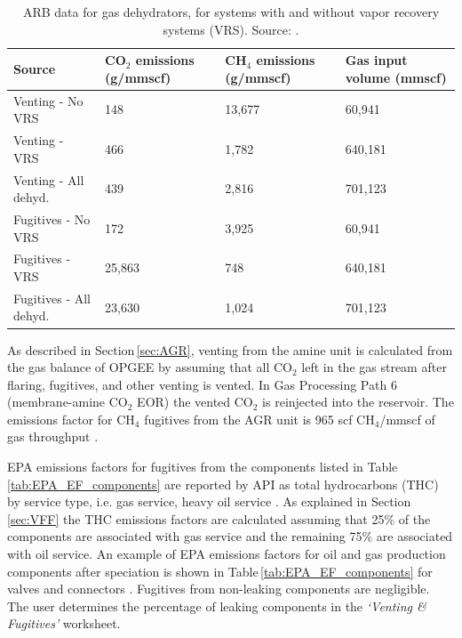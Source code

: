 \documentclass[11pt]{report}
\newcommand{\sheet}[1]{\textit{`{#1}'}}
\begin{document}
\begin{table}
\begin{scriptsize}
\caption{ARB data for gas dehydrators, for systems with and without vapor recovery systems (VRS). Source: \cite{ARB2013}.}
\label{tab:ARB_dehydrators_EF}
\begin{threeparttable}
\begin{tabular*}{0.9\columnwidth}{p{}p{}p{}p{}}
\toprule
Source & CO$_{2}$ emissions (g/mmscf) & CH$_{4}$ emissions (g/mmscf) & Gas input volume (mmscf) \\
\midrule
Venting - No VRS & 148 & 13,677 & 60,941 \\ 
Venting - VRS & 466 & 1,782 & 640,181 \\
Venting - All dehyd. & 439 & 2,816 & 701,123 \\
\midrule
Fugitives - No VRS & 172 & 3,925 & 60,941 \\
Fugitives - VRS & 25,863 & 748 & 640,181 \\ 
Fugitives - All dehyd. & 23,630 & 1,024 & 701,123 \\
\bottomrule
\end{tabular*}
\end{threeparttable}
\end{scriptsize}
\end{table}



As described in Section\,\ref{sec:AGR}, venting from the amine unit is calculated from the gas balance of OPGEE by assuming that all CO$_{2}$ left in the gas stream after flaring, fugitives, and other venting is vented. In Gas Processing Path 6 (membrane-amine CO$_2$ EOR) the vented CO$_2$ is reinjected into the reservoir. The emissions factor for CH$_{4}$ fugitives from the AGR unit is 965 scf CH$_{4}$/mmscf of gas throughput \cite[p. 23]{EPA1996}. 

EPA emissions factors for fugitives from the components listed in Table\,\ref{tab:EPA_EF_components} are reported by API as total hydrocarbons (THC) by service type, i.e. gas service, heavy oil service \cite[p. 20]{API1996b}. As explained in Section\,\ref{sec:VFF} the THC emissions factors are calculated assuming that 25\% of the components are associated with gas service and the remaining 75\% are associated with oil service. An example of EPA emissions factors for oil and gas production components after speciation is shown in Table\,\ref{tab:EPA_EF_components} for valves and connectors \cite[p. 20]{API1996b}. Fugitives from non-leaking components are negligible. The user determines the percentage of leaking components in the \sheet{Venting \& Fugitives} worksheet. 
\end{document}
